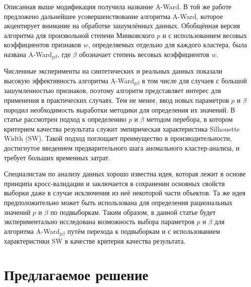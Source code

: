 \documentclass[12pt]{a&t}
\begin{document}
Описанная выше модификация получила название \mbox{A-Ward}. В той же работе \cite{Amorim-Makarenkov-Mirkin} предложено дальнейшее усовершенствование алгоритма \mbox{A-Ward}, которое акцентирует внимание на обработке зашумлённых данных. Обобщённая версия алгоритма для произвольной степени Минковского $ p $ и с использованием весовых коэффициентов признаков $ w $, определяемых отдельно для каждого кластера, была названа \mbox{A-Ward$ _{p\beta} $}, где $ \beta $ обозначает степень весовых коэффициентов $ w $.

Численные эксперименты на синтетических и реальных данных показали высокую эффективность алгоритма \mbox{A-Ward$ _{p\beta} $} в том числе для случаев с большой зашумленностью признаков, поэтому алгоритм представляет интерес для применения в практических случаях. Тем не менее, ввод новых параметров $ p $ и $ \beta $ породил необходимость выработки методики для определения их значений. В статье \cite{SW-Based-Search} рассмотрен подход к определению $ p $ и $ \beta $ методом перебора, в котором критерием качества результата служит эмпирическая характеристика Silhouette Width (SW)\cite{SW-Canonical}. Такой подход поглощает преимущество в производительности, достигнутое введением предварительного шага аномального кластер-анализа, и требует больших временных затрат.

Специалистам по анализу данных хорошо известна идея, которая лежит в основе принципа кросс-валидации \cite{CrossValidation-canonical} и заключается в сохранении основных свойств выборки даже в случае исключения из неё некоторой части объектов. Та же идея предположительно может быть использована для определения рациональных значений $ p $ и $ \beta $ по подвыборкам. Таким образом, в данной статье будет экспериментально исследована возможность выбора параметров $ p $ и $ \beta $ для алгоритма \mbox{A-Ward$ _{p\beta} $} путём перехода к подвыборкам и с использованием характеристики SW в качестве критерия качества результата.

\section{Предлагаемое решение}
\end{document}

